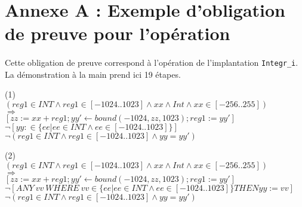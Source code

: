 


\newcommand{\fleche}{\Rightarrow}
\newcommand{\et}{\wedge}

\newcommand{\N}{I\hspace{-0.3em}N}

\newcommand{\nil}{\textsf{nil}}
\newcommand{\true}{\textsf{true}}
\newcommand{\bool}{\textsf{bool}}

\newcommand{\tab}[1]{\mbox{}\hspace{#1}}



\section*{Annexe A : Exemple d'obligation de preuve pour l'opération}

\paragraph{}
Cette obligation de preuve correspond à l'opération de l'implantation
\texttt{Integr\_i}. 
La démonstration à la main prend ici 19 étapes.

\bigskip\noindent
(1)\\
$(reg1\in INT\et reg1\in[-1024..1023]\et xx\et Int\et xx\in[-256..255])$\\
$\fleche$\\
$[zz:=xx+reg1; yy'\longleftarrow bound(-1024, zz, 1023); reg1:=yy']$ \\
$\neg[yy:\in \{ ee | ee\in INT \et ee\in [-1024..1023] \}]$ \\
$\neg(reg1\in INT\et reg1\in[-1024..1023]\et yy = yy')$

\bigskip\noindent
(2)\\
$(reg1\in INT\et reg1\in[-1024..1023]\et xx\et Int\et xx\in[-256..255])$\\
$\fleche$\\
$[zz:=xx+reg1;yy'\longleftarrow bound(-1024, zz, 1023); reg1:=yy']$ \\
$\neg[ANY~ vv ~WHERE~ vv\in \{ ee | ee\in INT \et ee\in [-1024..1023] \} THEN yy:=vv]$ \\
$\neg(reg1\in INT\et reg1\in[-1024..1023]\et yy = yy')$

